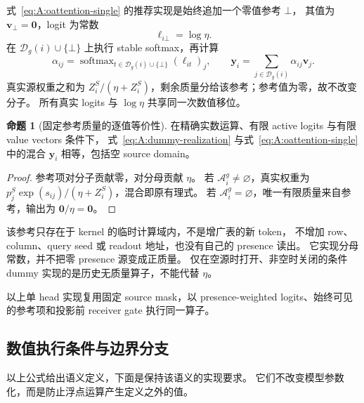 \documentclass[11pt,UTF8,fontset=fandol]{ctexart}
\numberwithin{equation}{section}
\theoremstyle{definition}
\newtheorem{proposition}[definition]{命题}
\newcommand{\Dset}{\mathcal D}
\begin{document}
式~\eqref{eq:A:oattention-single} 的推荐实现是始终追加一个零值参考 $\bot$，
其值为 $\bm v_\bot=\bm0$，logit 为常数
\begin{equation}
  \ell_{i\bot}=\log\eta.
  \label{eq:A:reference-logit}
\end{equation}
在 $\Dset_g(i)\cup\{\bot\}$ 上执行 stable softmax，再计算
\begin{equation}
  \alpha_{ij}
    =\operatorname{softmax}_{t\in\Dset_g(i)\cup\{\bot\}}(\ell_{it})_j,
  \qquad
  \bm y_i=\sum_{j\in\Dset_g(i)}\alpha_{ij}\bm v_j.
  \label{eq:A:dummy-realization}
\end{equation}
真实源权重之和为 $Z_i^S/(\eta+Z_i^S)$，剩余质量分给该参考；参考值为零，故不改变分子。
所有真实 logits 与 $\log\eta$ 共享同一次数值移位。

\begin{proposition}[固定参考质量的逐值等价性]
在精确实数运算、有限 active logits 与有限 value vectors 条件下，
式~\eqref{eq:A:dummy-realization} 与式~\eqref{eq:A:oattention-single}
中的混合 $\bm y_i$ 相等，包括空 source domain。
\end{proposition}
\begin{proof}
参考项对分子贡献零，对分母贡献 $\eta$。
若 $\mathcal A_i^g\ne\varnothing$，真实权重为
$p_j^S\exp(s_{ij})/(\eta+Z_i^S)$，混合即原有理式。
若 $\mathcal A_i^g=\varnothing$，唯一有限质量来自参考，输出为 $\bm0/\eta=\bm0$。
\end{proof}

该参考只存在于 kernel 的临时计算域内，不是增广表的新 token，
不增加 row、column、query seed 或 readout 地址，也没有自己的 presence 读出。
它实现分母常数，并不把零 presence 源变成正质量。
仅在空源时打开、非空时关闭的条件 dummy 实现的是历史无质量算子，不能代替 $\eta$。

以上单 head 实现复用固定 source mask，以 presence-weighted logits、始终可见的参考项和投影前 receiver gate 执行同一算子。


\subsection{数值执行条件与边界分支}
\label{subsec:A:numeric}

以上公式给出语义定义，下面是保持该语义的实现要求。
它们不改变模型参数化，而是防止浮点运算产生定义之外的值。
\end{document}
